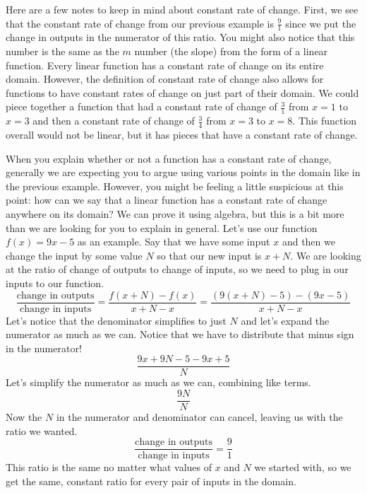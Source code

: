 \documentclass{ximera}
\begin{document}
Here are a few notes to keep in mind about constant rate of change. First, we see that the constant rate of change from our previous example is $\frac{9}{1}$ since we put the change in outputs in the numerator of this ratio. You might also notice that this number is the same as the $m$ number (the slope) from the form of a linear function. Every linear function has a constant rate of change on its entire domain. However, the definition of constant rate of change also allows for functions to have constant rates of change on just part of their domain. We could piece together a function that had a constant rate of change of $\frac{3}{1}$ from $x=1$ to $x=3$ and then a constant rate of change of $\frac{3}{4}$ from $x=3$ to $x=8$. This function overall would not be linear, but it has pieces that have a constant rate of change.

When you explain whether or not a function has a constant rate of change, generally we are expecting you to argue using various points in the domain like in the previous example. However, you might be feeling a little suspicious at this point: how can we say that a linear function has a constant rate of change anywhere on its domain? We can prove it using algebra, but this is a bit more than we are looking for you to explain in general. Let's use our function $f(x) = 9x-5$ as an example. Say that we have some input $x$ and then we change the input by some value $N$ so that our new input is $x+N$. We are looking at the ratio of change of outputs to change of inputs, so we need to plug in our inputs to our function.
\[
\frac{\textrm{change in outputs}}{\textrm{change in inputs}} = \frac{f(x+N)-f(x)}{x+N-x} = \frac{(9(x+N)-5)-(9x-5)}{x+N-x}
\]
Let's notice that the denominator simplifies to just $N$ and let's expand the numerator as much as we can. Notice that we have to distribute that minus sign in the numerator!
\[
\frac{9x+9N-5-9x+5}{N}
\]
Let's simplify the numerator as much as we can, combining like terms.
\[
\frac{9N}{N}
\]
Now the $N$ in the numerator and denominator can cancel, leaving us with the ratio we wanted.
\[
\frac{\textrm{change in outputs}}{\textrm{change in inputs}} = \frac{9}{1}
\]
This ratio is the same no matter what values of $x$ and $N$ we started with, so we get the same, constant ratio for every pair of inputs in the domain.
\end{document}
